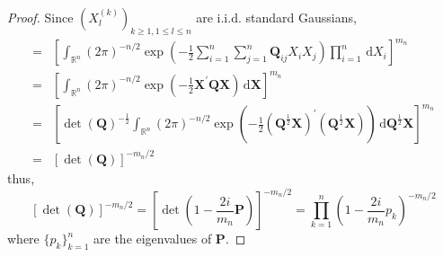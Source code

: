 \begin{proof}
    Since $\left(X_{l}^{(k)}\right)_{k\geq 1,1\leq l\leq n}$ are i.i.d. standard Gaussians,
    \begin{equation*}
        \begin{aligned}
            = & \left[\int_{\mathbb{R}^{n}}(2\pi)^{-n/2}\exp\left(-\frac{1}{2}\sum_{i=1}^{n}\sum_{j=1}^{n}\mathbf{Q}_{ij}X_{i}X_{j}\right)\prod_{i=1}^{n}\,\mathrm{d}X_{i}\right]^{m_{n}}                                                                                                                         \\
            = & \left[\int_{\mathbb{R}^{n}}(2\pi)^{-n/2}\exp\left(-\frac{1}{2}\mathbf{X}^{\prime}\mathbf{Q}\mathbf{X}\right)\,\mathrm{d}\mathbf{X}\right]^{m_{n}}                                                                                                                                                 \\
            = & \left[\operatorname{det}\left(\mathbf{Q}\right)^{-\frac{1}{2}}\int_{\mathbb{R}^{n}}(2\pi)^{-n/2}\exp\left(-\frac{1}{2}\left(\mathbf{Q}^{\frac{1}{2}}\mathbf{X}\right)^{\prime}\left(\mathbf{Q}^{\frac{1}{2}}\mathbf{X}\right)\right)\,\mathrm{d}\mathbf{Q}^{\frac{1}{2}}\mathbf{X}\right]^{m_{n}} \\
            = & \left[\operatorname{det}\left(\mathbf{Q}\right)\right]^{-m_{n}/2}
        \end{aligned}
    \end{equation*}
    thus,
    \begin{equation}
        \left[\operatorname{det}\left(\mathbf{Q}\right)\right]^{-m_{n}/2}=\left[\operatorname{det}\left(1-\frac{2i}{m_{n}}\mathbf{P}\right)\right]^{-m_{n}/2}=\prod_{k=1}^{n}\left(1-\frac{2i}{m_n}p_{k}\right)^{-m_{n}/2}
        \label{eq:characteristic-function-wishart-result-1}
    \end{equation}
    where $\{p_{k}\}_{k=1}^{n}$ are the eigenvalues of $\mathbf{P}$.


\end{proof}
